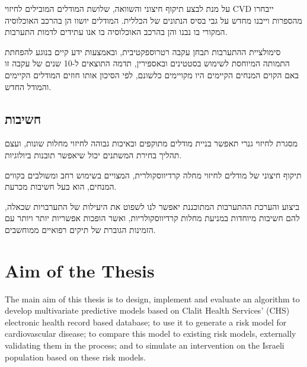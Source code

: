 \documentclass[a4paper,12pt]{article}
\begin{document}
\begin{hebrew}
		על מנת לבצע תיקוף חיצוני והשוואה, שלושת המודלים המובילים לחיזוי CVD ייבחרו מהספרות וייבנו מחדש על גבי בסיס הנתונים של הכללית. המודלים יושוו הן בהרכב האוכלוסיה המקורי בו נבנו והן בהרכב האוכלוסיה בו אנו עתידים לדמות התערבות.
		
		סימולציית ההתערבות תבחן עקבה רטרוספקטיבית, ובאמצעות ידע קיים בנוגע להפחתת התמותה המיוחסת לשימוש בסטטינים ובאספירין, תדמה התוצאים ל-10 שנים  של עקבה זו  באם הקוים המנחים הקיימים היו מקויימים כלשונם, לפי הסיכון אותו חוזים המודלים הקיימים והמודל החדש.
		
		
		\subsection*{חשיבות}
		מסגרת לחיזוי גנרי תאפשר בניית מודלים מתוקפים ובאיכות גבוהה לחיזוי מחלות שונות, ועצם תהליך בחירת המשתנים יכול שיאפשר תובנות ביולוגיות.
		
		תיקוף חיצוני של מודלים לחיזוי מחלה קרדיווסקולרית, המצויים בשימוש רחב ומשולבים בקווים המנחים, הוא בעל חשיבות מכרעת\cite{Collins2015}.
		
			ביצוע והערכת ההתערבות המתוכננת יאפשר לנו לשפוט את היעילות של התערבויות שכאלה, להם חשיבות מיוחדות במניעת מחלות קרדיווסקולריות, ואשר הופכות אפשריות יותר ויותר עם הזמינות הגוברת של תיקים רפואיים ממוחשבים.
		
	\end{hebrew}
	
	\section{Aim of the Thesis}
	The main aim of this thesis is to design, implement and evaluate an algorithm to develop multivariate predictive models based on Clalit Health Services' (CHS) electronic health record based database; to use it to generate a risk model for cardiovascular disease; to compare this model to existing risk models, externally validating them in the process; and to simulate an intervention on the Israeli population based on these risk models.
	
\end{document}
